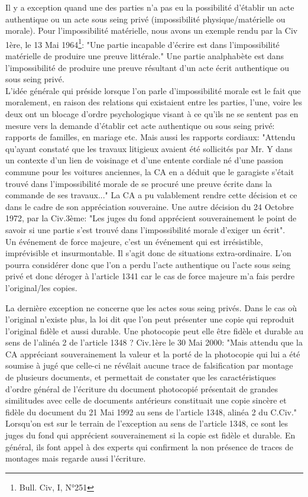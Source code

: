 Il y a exception quand une des parties n'a pas eu la possibilité d'établir un acte authentique ou un acte sous seing privé (impossibilité physique/matérielle ou morale). Pour l'impossibilité matérielle, nous avons un exemple rendu par la Civ 1ère, le 13 Mai 1964\footnote{Bull. Civ, I, N°251}: "Une partie incapable d'écrire est dans l'impossibilité matérielle de produire une preuve littérale." Une partie analphabète est dans l'impossibilité de produire une preuve résultant d'un acte écrit authentique ou sous seing privé. \\
L'idée générale qui préside lorsque l'on parle d'impossibilité morale est le fait que moralement, en raison des relations qui existaient entre les parties, l'une, voire les deux ont un blocage d'ordre psychologique visant à ce qu'ils ne se sentent pas en mesure vers la demande d'établir cet acte authentique ou sous seing privé: rapports de familles, en mariage etc. Mais aussi les rapports cordiaux: "Attendu qu'ayant constaté que les travaux litigieux avaient été sollicités par Mr. Y dans un contexte d'un lien de voisinage et d'une entente cordiale né d'une passion commune pour les voitures anciennes, la CA en a déduit que le garagiste s'était trouvé dans l'impossibilité morale de se procuré une preuve écrite dans la commande de ses travaux..." La CA a pu valablement rendre cette décision et ce dans le cadre de son appréciation souveraine. Une autre décision du 24 Octobre 1972, par la Civ.3ème: "Les juges du fond apprécient souverainement le point de savoir si une partie s'est trouvé dans l'impossibilité morale d'exiger un écrit". \\


Un événement de force majeure, c'est un événement qui est irrésistible, imprévisible et insurmontable. Il s'agit donc de situations extra-ordinaire. L'on pourra considérer donc que l'on a perdu l'acte authentique ou l'acte sous seing privé et donc déroger à l'article 1341 car le cas de force majeure m'a fais perdre l'original/les copies.


La dernière exception ne concerne que les actes sous seing privés. Dans le cas où l'original n'existe plus, la loi dit que l'on peut présenter une copie qui reproduit l'original fidèle et aussi durable. Une photocopie peut elle être fidèle et durable au sens de l'alinéa 2 de l'article 1348 ? Civ.1ère le 30 Mai 2000: "Mais attendu que la CA appréciant souverainement la valeur et la porté de la photocopie qui lui a été soumise à jugé que celle-ci ne révélait aucune trace de falsification par montage de plusieurs documents, et permettait de constater que les caractéristiques d'ordre général de l'écriture du document photocopié présentait de grandes similitudes avec celle de documents antérieurs constituait une copie sincère et fidèle du document du 21 Mai 1992 au sens de l'article 1348, alinéa 2 du C.Civ." \\
Lorsqu'on est sur le terrain de l'exception au sens de l'article 1348, ce sont les juges du fond qui apprécient souverainement si la copie est fidèle et durable. En général, ils font appel à des experts qui confirment la non présence de traces de montages mais regarde aussi l'écriture.


